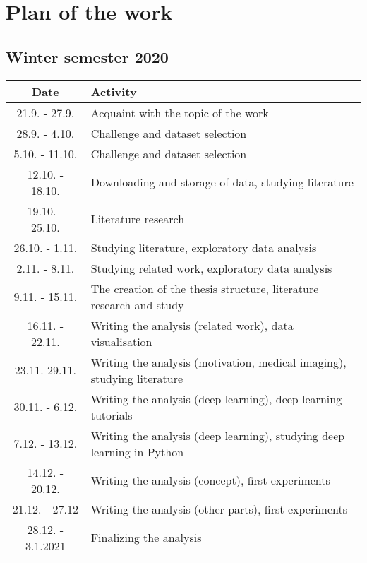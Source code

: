 
\chapter*{Plan of the work}
\label{chap:plan}

\section*{Winter semester 2020}

\begin{tabular}{ |c|m{12cm}| } 
 \hline
 Date & Activity \\
 \hline
 \hline
 21.9. - 27.9. & Acquaint with the topic of the work\\ 
 \hline
 28.9. - 4.10. & Challenge and dataset selection \\ 
 \hline
 5.10. - 11.10. & Challenge and dataset selection \\ 
 \hline
 12.10. - 18.10. & Downloading and storage of data, studying literature \\ 
 \hline
 19.10. - 25.10. & Literature research\\ 
 \hline
 26.10. - 1.11. & Studying literature, exploratory data analysis \\ 
 \hline
 2.11. - 8.11. & Studying related work, exploratory data analysis \\
 \hline
 9.11. - 15.11. & The creation of the thesis structure, literature research and study \\ 
 \hline
 16.11. - 22.11. & Writing the analysis (related work), data visualisation \\ 
 \hline
 23.11. 29.11. & Writing the analysis (motivation, medical imaging), studying literature \\ 
 \hline
 30.11. - 6.12. & Writing the analysis (deep learning), deep learning tutorials \\ 
 \hline
 7.12. - 13.12. & Writing the analysis (deep learning), studying deep learning in Python \\ 
 \hline
 14.12. - 20.12. & Writing the analysis (concept), first experiments \\ 
 \hline
 21.12. - 27.12 & Writing the analysis (other parts), first experiments \\ 
 \hline
 28.12. - 3.1.2021 & Finalizing the analysis \\ 
 \hline
\end{tabular}




